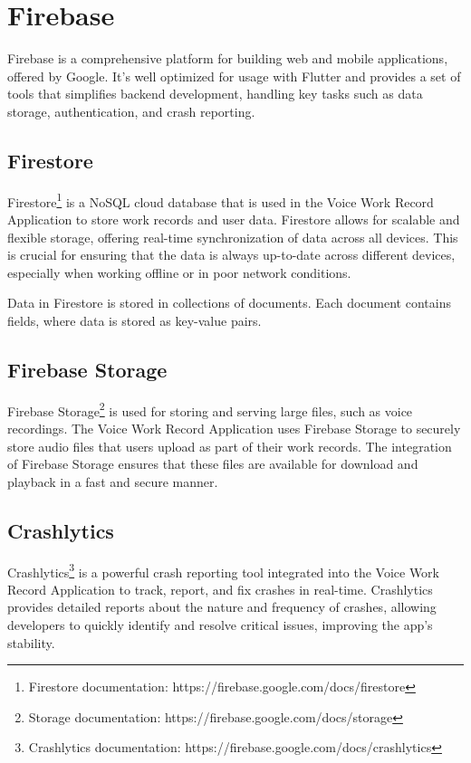 \documentclass[
  digital,     %
  oneside,     %
  nosansbold,  %
  nocolorbold, %
  lof,         %
  lot,         %
]{fithesis4}
\begin{document}
\section{Firebase}

Firebase is a comprehensive platform for building web and mobile applications, offered by Google. It's well optimized for usage with Flutter and provides a set of tools that simplifies backend development, handling key tasks such as data storage, authentication, and crash reporting.

\subsection{Firestore}

Firestore\footnote{Firestore documentation: https://firebase.google.com/docs/firestore} is a NoSQL cloud database that is used in the Voice Work Record Application to store work records and user data. Firestore allows for scalable and flexible storage, offering real-time synchronization of data across all devices. This is crucial for ensuring that the data is always up-to-date across different devices, especially when working offline or in poor network conditions.

Data in Firestore is stored in collections of documents. Each document contains fields, where data is stored as key-value pairs.

\subsection{Firebase Storage}

Firebase Storage\footnote{Storage documentation: https://firebase.google.com/docs/storage} is used for storing and serving large files, such as voice recordings. The Voice Work Record Application uses Firebase Storage to securely store audio files that users upload as part of their work records. The integration of Firebase Storage ensures that these files are available for download and playback in a fast and secure manner.

\subsection{Crashlytics}

Crashlytics\footnote{Crashlytics documentation: https://firebase.google.com/docs/crashlytics} is a powerful crash reporting tool integrated into the Voice Work Record Application to track, report, and fix crashes in real-time. Crashlytics provides detailed reports about the nature and frequency of crashes, allowing developers to quickly identify and resolve critical issues, improving the app's stability.
\end{document}
